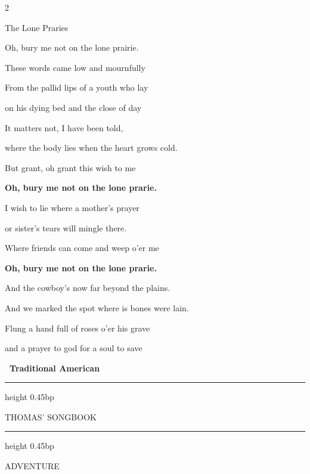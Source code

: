 \documentclass[10pt,twoside]{article}
\newlength{\songcolumnwidth}
\newcommand{\songbooktitle}{Thomas' Songbook}
\newcommand{\categorylabel}[1]{%
  {\categoryface\fontsize{17bp}{19bp}\selectfont\MakeUppercase{#1}}%
}
\newcommand{\category}[1]{%
  \par\noindent
  \parbox[c]{\songcolumnwidth}{%
    \centering
    \hrule height 0.45bp\vskip 2.5bp
    {\mastheadface\fontsize{10bp}{11bp}\selectfont\MakeUppercase{\songbooktitle}\par}%
    \vskip 2bp\hrule height 0.45bp
  }%
  \hfill
  \categorylabel{#1}%
  \par\vspace{11bp}%
}
\newcommand{\songtext}{\raggedright\fontsize{9bp}{9.15bp}\selectfont}
\newenvironment{songcolumns}
  {\begin{multicols*}{2}\songtext}
  {\end{multicols*}}
\newcommand{\songtitle}[1]{%
  \par\addvspace{9bp}%
  {\titleface\fontsize{14.5bp}{15bp}\selectfont #1\par}%
  \nobreak\vskip 2bp%
}
\newcommand{\lyric}[1]{%
  \hangindent=9bp\relax
  #1\par
}
\newenvironment{stanza}{\par\begingroup}{\par\endgroup\addvspace{4bp}}
\newcommand{\refrain}[1]{\lyric{\textbf{#1}}}
\newcommand{\chords}[1]{%
  \par\nobreak\vskip 2bp
  {\chordface\fontsize{10bp}{11bp}\selectfont\formatchords{#1}\par}%
  \addvspace{4bp}%
}
\newcommand{\songcredit}[1]{%
  \par\nobreak\noindent\hspace*{9bp}%
  {\sffamily\bfseries\fontsize{7bp}{8bp}\selectfont\textemdash\ #1\par}%
}
\begin{document}
\begin{songcolumns}
\songtitle{The Lone Praries}
\begin{stanza}
  \lyric{\textquotedbl{}Oh, bury me not on the lone prairie.\textquotedbl{}}
  \lyric{These words came low and mournfully}
  \lyric{From the pallid lips of a youth who lay}
  \lyric{on his dying bed and the close of day}
  \chords{Em - - - / G - - - / Em - - - / G - - - x3\\
          \textquotedbl{}     \textquotedbl{} / \textquotedbl{}     \textquotedbl{} / D - - -  / \textquotedbl{}     \textquotedbl{}}
\end{stanza}
\begin{stanza}
  \lyric{It matters not, I have been told,}
  \lyric{where the body lies when the heart grows cold.}
  \lyric{But grant, oh grant this wish to me}
  \refrain{Oh, bury me not on the lone prarie.}
\end{stanza}
\begin{stanza}
  \lyric{I wish to lie where a mother's prayer}
  \lyric{or sister's tears will mingle there.}
  \lyric{Where friends can come and weep o'er me}
  \refrain{Oh, bury me not on the lone prarie.}
\end{stanza}
\begin{stanza}
  \lyric{And the cowboy's now far beyond the plains.}
  \lyric{And we marked the spot where is bones were lain.}
  \lyric{Flung a hand full of roses o'er his grave}
  \lyric{and a prayer to god for a soul to save}
\end{stanza}
\songcredit{Traditional American}

\end{songcolumns}

\clearpage

\category{Adventure}
\end{document}
